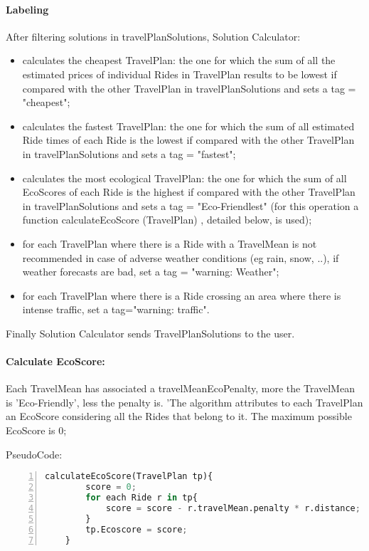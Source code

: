 	\paragraph{Labeling}
		\mbox{}\newline 
		After filtering solutions in travelPlanSolutions, Solution Calculator:\newline
	\begin{itemize}

		
	
		\item calculates the cheapest  TravelPlan: the one for which the sum of all the estimated prices of individual Rides in TravelPlan results to be lowest if compared with the other TravelPlan in travelPlanSolutions  and sets a tag = "cheapest";
	
		\item calculates the fastest TravelPlan: the one for which the sum of all estimated Ride times of each Ride is the lowest if compared with the other TravelPlan in travelPlanSolutions and sets a tag = "fastest"; 
		
		\item calculates the most ecological TravelPlan: the one for which  the sum of all EcoScores of each Ride is  the highest if compared with the other TravelPlan in travelPlanSolutions and sets a tag = "Eco-Friendlest" (for this operation a function calculateEcoScore (TravelPlan) , detailed below, is used);
	
		\item for each TravelPlan where there is a Ride with a TravelMean is not recommended in case of adverse weather conditions (eg rain, snow, ..), if weather forecasts are bad, set a tag = "warning: Weather";\newline
	
		\item for each TravelPlan where there is a Ride crossing an area where there is intense traffic, set a tag="warning: traffic". 
		\end{itemize}
	
		Finally Solution Calculator sends TravelPlanSolutions to the user.\newline
	
	
	\paragraph{Calculate EcoScore:}	
	\mbox{} \newline
		Each TravelMean has associated a travelMeanEcoPenalty, more the TravelMean is 'Eco-Friendly', less the penalty is. 'The algorithm attributes to each TravelPlan an EcoScore considering all the Rides that belong to it.
		The maximum possible EcoScore is 0; \newline
	
	PseudoCode: \newline
	\begin{lstlisting}[language=python, numbers=left]
	calculateEcoScore(TravelPlan tp){
		score = 0;
		for each Ride r in tp{
			score = score - r.travelMean.penalty * r.distance;
		}
		tp.Ecoscore = score;
	}
	\end{lstlisting}